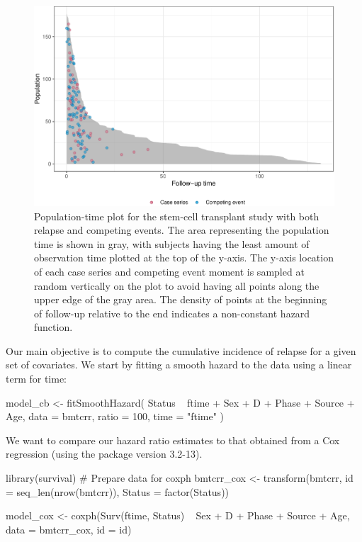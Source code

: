 \begin{figure}[ht]
\includegraphics[width=\textwidth,keepaspectratio=true]{./compPop-1} \caption{Population-time plot for the stem-cell transplant study with both relapse and competing events. The area representing the population time is shown in gray, with subjects having the least amount of observation time plotted at the top of the y-axis. The y-axis location of each case series and competing event moment is sampled at random vertically on the plot to avoid having all points along the upper edge of the gray area. The density of points at the beginning of follow-up relative to the end indicates a non-constant hazard function.}\label{fig:compPop}
\end{figure}

Our main objective is to compute the cumulative incidence of relapse for a given set of covariates. We start by fitting a smooth hazard to the data using a linear term for time:

\begin{Schunk}
\begin{Sinput}
model_cb <- fitSmoothHazard(
  Status ~ ftime + Sex + D + Phase + Source + Age,
  data = bmtcrr,
  ratio = 100,
  time = "ftime"
)
\end{Sinput}
\end{Schunk}

We want to compare our hazard ratio estimates to that obtained from a Cox regression (using the  package version 3.2-13).

\begin{Schunk}
\begin{Sinput}
library(survival)
# Prepare data for coxph
bmtcrr_cox <- transform(bmtcrr, 
                        id = seq_len(nrow(bmtcrr)),
                        Status = factor(Status))

model_cox <- coxph(Surv(ftime, Status) ~ Sex + D + Phase + Source + Age,
                   data = bmtcrr_cox, id = id)
\end{Sinput}
\end{Schunk}

